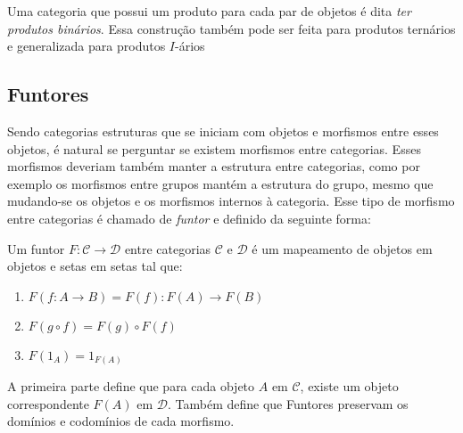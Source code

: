 \documentclass[../main.tex]{subfiles}
\begin{document}
Uma categoria que possui um produto para cada par de objetos é dita \emph{ter produtos binários}. Essa construção também pode ser feita para produtos ternários e generalizada para produtos $I$-ários


\subsection{Funtores}

Sendo categorias estruturas que se iniciam com objetos e morfismos entre esses objetos, é natural se perguntar se existem morfismos entre categorias. Esses morfismos deveriam também manter a estrutura entre categorias, como por exemplo os morfismos entre grupos mantém a estrutura do grupo, mesmo que mudando-se os objetos e os morfismos internos à categoria. Esse tipo de morfismo entre categorias é chamado de \emph{funtor} e definido da seguinte forma:

\begin{definition}
    Um funtor $F : \mathcal{C} \to \mathcal{D}$ entre categorias $\mathcal{C}$ e $\mathcal{D}$ é um mapeamento de objetos em objetos e setas em setas tal que:
    \begin{enumerate}
        \item $F(f : A \to B) = F(f) : F(A) \to F(B)$
        \item $F(g \circ f) = F(g) \circ F(f)$
        \item $F(1_A) = 1_{F(A)}$
    \end{enumerate}
\end{definition}

A primeira parte define que para cada objeto $A$ em $\mathcal{C}$, existe um objeto correspondente $F(A)$ em $\mathcal{D}$. Também define que Funtores preservam os domínios e codomínios de cada morfismo.
\end{document}
